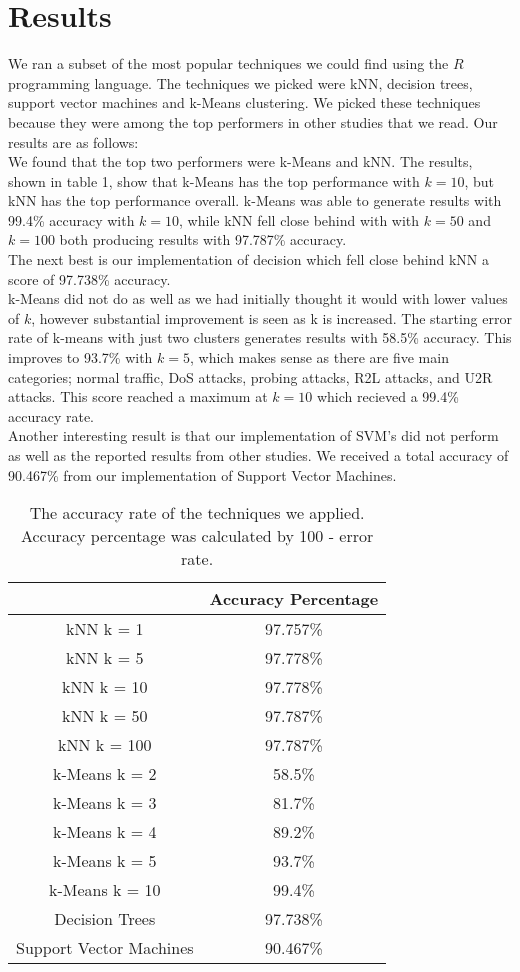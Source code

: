 \documentclass[12pt]{article} %
\begin{document}
\section{Results}
We ran a subset of the most popular techniques we could find using the $R$ programming language. The techniques we picked were kNN, decision trees, support vector machines and k-Means clustering. We picked these techniques because they were among the top performers in other studies that we read. Our results are as follows:\\
We found that the top two performers were k-Means and kNN. The results, shown in table 1, show that k-Means has the top performance with $k = 10$, but kNN has the top performance overall. k-Means was able to generate results with 99.4\% accuracy with $k = 10$, while kNN fell close behind with with $k = 50$ and $k = 100$ both producing results with 97.787\% accuracy.\\ 
The next best is our implementation of decision which fell close behind kNN a score of 97.738\% accuracy. \\
k-Means did not do as well as we had initially thought it would with lower values of $k$, however substantial improvement is seen as k is increased. The starting error rate of k-means with just two clusters generates results with 58.5\% accuracy. This improves to 93.7\% with $k = 5$, which makes sense as there are five main categories; normal traffic, DoS attacks, probing attacks, R2L attacks, and U2R attacks. This score reached a maximum at $k = 10$ which recieved a 99.4\% accuracy rate.\\
Another interesting result is that our implementation of SVM's did not perform as well as the reported results from other studies. We received a total accuracy of 90.467\% from our implementation of Support Vector Machines.\\
\begin{table*}[!htbp]
\begin{center}
\caption{The accuracy rate of the techniques we applied. Accuracy percentage was calculated by 100 - error rate.}
\begin{tabular}{ | c | c |}
\hline
& Accuracy Percentage \\
\hline
kNN k = 1 & 97.757\% \\
kNN k = 5 & 97.778\% \\
kNN k = 10 & 97.778\% \\
kNN k = 50 & 97.787\% \\
kNN k = 100 & 97.787\% \\
\hline
k-Means k = 2 & 58.5\% \\
k-Means k = 3 & 81.7\% \\
k-Means k = 4 & 89.2\% \\
k-Means k = 5 & 93.7\% \\
k-Means k = 10 & 99.4\% \\
\hline
Decision Trees & 97.738\% \\
\hline
Support Vector Machines & 90.467\% \\
\hline
\end{tabular}
\end{center}
\end{table*}
\end{document}
